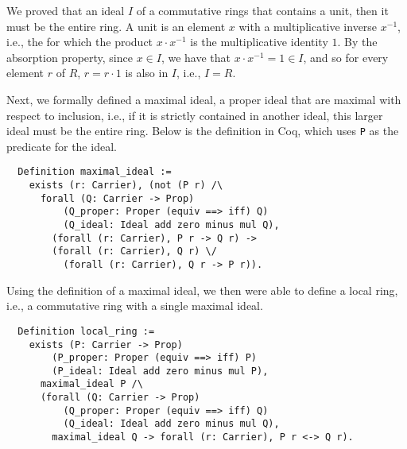 \documentclass{article}
\begin{document}
We proved that an ideal $I$ of a commutative rings that contains a unit, then it must be the entire ring.  A unit is 
an element $x$ with a multiplicative inverse $x^{-1}$, i.e., the for which the product $x \cdot x^{-1}$ is the multiplicative identity $1$.  By the absorption property, since $x \in I$, we have that $x \cdot x^{-1} = 1 \in I$, and so for every element $r$ of $R$, $r = r \cdot 1$ is also in $I$, i.e., $I=R$. 



Next, we formally defined a maximal ideal, a proper ideal that are maximal with respect to inclusion, i.e., if it is strictly contained in another ideal, this larger ideal must be the entire ring. 
Below is the definition in Coq,
which uses \texttt{P} as the predicate for the ideal.

\begin{verbatim}
  Definition maximal_ideal :=
    exists (r: Carrier), (not (P r) /\
      forall (Q: Carrier -> Prop)
          (Q_proper: Proper (equiv ==> iff) Q)
          (Q_ideal: Ideal add zero minus mul Q),
        (forall (r: Carrier), P r -> Q r) ->
        (forall (r: Carrier), Q r) \/
          (forall (r: Carrier), Q r -> P r)).
\end{verbatim}

Using the definition of a maximal ideal, we then were able to define a local ring, i.e., a commutative ring with a single maximal ideal.
 
 \begin{verbatim}
  Definition local_ring :=
    exists (P: Carrier -> Prop)
        (P_proper: Proper (equiv ==> iff) P)
        (P_ideal: Ideal add zero minus mul P),
      maximal_ideal P /\
      (forall (Q: Carrier -> Prop)
          (Q_proper: Proper (equiv ==> iff) Q)
          (Q_ideal: Ideal add zero minus mul Q),
        maximal_ideal Q -> forall (r: Carrier), P r <-> Q r).
\end{verbatim}


\end{document}
